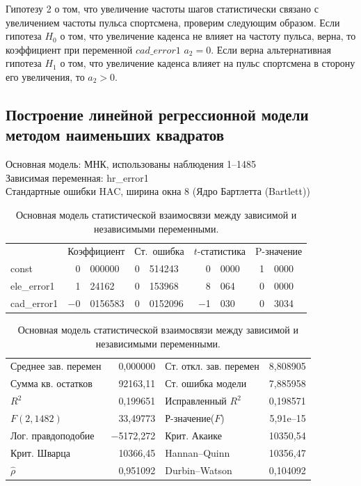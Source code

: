 \documentclass[a4paper,12pt]{article}
\begin{document}
Гипотезу 2 о том, что увеличение частоты шагов статистически связано с увеличением частоты пульса спортсмена, проверим следующим образом. Если гипотеза $H_0$ о том, что увеличение каденса не влияет на частоту пульса, верна, то коэффициент при переменной $cad\_error1$ $a_2 = 0$. Если верна альтернативная гипотеза $H_1$ о том, что увеличение каденса влияет на пульс спортсмена в сторону его увеличения, то $a_2 > 0$.

\subsection{Построение линейной регрессионной модели методом наименьших квадратов}

\begin{table}[H]
\begin{center}
	
	Основная модель: МНК, использованы наблюдения 1--1485\\
	Зависимая переменная: hr\_error1\\
	Стандартные ошибки HAC, ширина окна 8 (Ядро Бартлетта (Bartlett))
	
	\vspace{1em}
	
	\begin{tabular}{lr@{,}lr@{,}lr@{,}lr@{,}l}
		&
		\multicolumn{2}{c}{Коэффициент} &
		\multicolumn{2}{c}{Ст.\ ошибка} &
		\multicolumn{2}{c}{$t$-статистика} &
		\multicolumn{2}{c}{P-значение} \\[1ex]
		const &
		0&000000 &
		0&514243 &
		0&0000 &
		1&0000 \\
		ele\_error1 &
		1&24162 &
		0&153968 &
		8&064 &
		0&0000 \\
		cad\_error1 &
		$-$0&0156583 &
		0&0152096 &
		$-$1&030 &
		0&3034 \\
	\end{tabular}
	
	\vspace{1ex}
	\begin{tabular}{lrlr}
		Среднее зав. перемен &  0,000000 & Ст. откл. зав. перемен &  8,808905 \\
		Сумма кв. остатков &  92163,11 & Ст. ошибка модели &  7,885958 \\
		$R^2$ &  0,199651 & Исправленный $R^2$ &  0,198571 \\
		$F(2, 1482)$ &  33,49773 & Р-значение($F$) &  5,91\textrm{e--15} \\
		Лог. правдоподобие & $-$5172,272 & Крит. Акаике &  10350,54 \\
		Крит. Шварца &  10366,45 & Hannan--Quinn &  10356,47 \\
		$\hat{\rho}$ &  0,951092 & Durbin--Watson &  0,104092 \\
	\end{tabular}
\end{center}
\caption{Основная модель статистической взаимосвязи между зависимой и независимыми переменными.}
\label{tab:table3}
\end{table}
\end{document}
